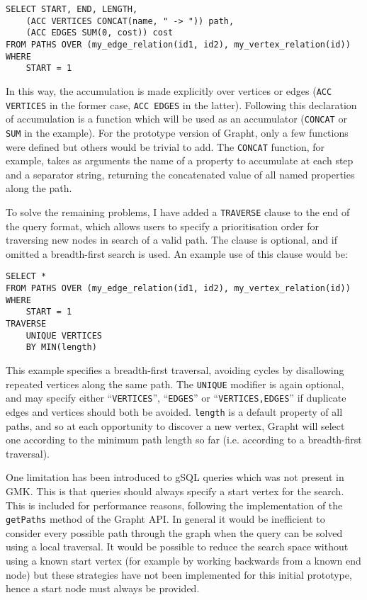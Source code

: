\begin{verbatim}
SELECT START, END, LENGTH, 
    (ACC VERTICES CONCAT(name, " -> ")) path,
    (ACC EDGES SUM(0, cost)) cost 
FROM PATHS OVER (my_edge_relation(id1, id2), my_vertex_relation(id))
WHERE 
    START = 1
\end{verbatim}

In this way, the accumulation is made explicitly over vertices or edges
(\texttt{ACC VERTICES} in the former case, \texttt{ACC EDGES} in the latter).
Following this declaration of accumulation is a function which will be used as
an accumulator (\texttt{CONCAT} or \texttt{SUM} in the example). For the
prototype version of Grapht, only a few functions were defined but others
would be trivial to add. The \texttt{CONCAT} function, for example, takes as
arguments the name of a property to accumulate at each step and a separator
string, returning the concatenated value of all named properties along the
path.

To solve the remaining problems, I have added a \texttt{TRAVERSE} clause to
the end of the query format, which allows users to specify a prioritisation
order for traversing new nodes in search of a valid path. The clause is
optional, and if omitted a breadth-first search is used. An example use of this
clause would be:

\begin{verbatim}
SELECT * 
FROM PATHS OVER (my_edge_relation(id1, id2), my_vertex_relation(id))
WHERE 
    START = 1
TRAVERSE 
    UNIQUE VERTICES 
    BY MIN(length)
\end{verbatim}

This example specifies a breadth-first traversal, avoiding cycles by
disallowing repeated vertices along the same path. The \texttt{UNIQUE}
modifier is again optional, and may specify either ``\texttt{VERTICES}'',
``\texttt{EDGES}'' or ``\texttt{VERTICES,EDGES}'' if duplicate edges and
vertices should both be avoided. \texttt{length} is a default property of all
paths, and so at each opportunity to discover a new vertex, Grapht will
select one according to the minimum path length so far (i.e. according to a
breadth-first traversal).

One limitation has been introduced to gSQL queries which was not present in
GMK. This is that queries should always specify a start vertex for the search.
This is included for performance reasons, following the implementation of the
\texttt{getPaths} method of the Grapht API.  In general it would be
inefficient to consider every possible path through the graph when the query
can be solved using a local traversal. It would be possible to reduce the
search space without using a known start vertex (for example by working
backwards from a known end node) but these strategies have not been
implemented for this initial prototype, hence a start node must always be
provided.





